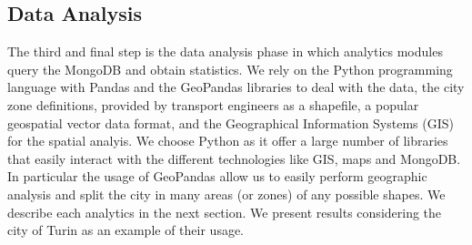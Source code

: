 \subsection{Data Analysis}

The third and final step is the data analysis phase in which analytics modules query the MongoDB and obtain statistics. We rely on the Python programming language with Pandas and the GeoPandas libraries to deal with the data, the city zone definitions,
provided by transport engineers as a shapefile, a popular geospatial vector data format,
 and the Geographical Information Systems (GIS) for the spatial analyis. We choose Python as it offer a large number of  libraries that easily interact with the different technologies like GIS, maps and MongoDB. In particular the usage of GeoPandas allow us to easily perform geographic analysis and split the city in many areas (or zones) of any possible shapes. We describe each analytics in the next section. We present results considering the city of Turin as an example of their usage.

